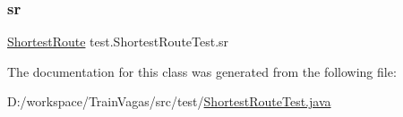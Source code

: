 \subsubsection{\texorpdfstring{sr}{sr}}
{\footnotesize\ttfamily \hyperlink{classdomain_1_1_shortest_route}{Shortest\+Route} test.\+Shortest\+Route\+Test.\+sr\hspace{0.3cm}{\ttfamily [package]}}



The documentation for this class was generated from the following file\+:\begin{DoxyCompactItemize}
\item 
D\+:/workspace/\+Train\+Vagas/src/test/\hyperlink{_shortest_route_test_8java}{Shortest\+Route\+Test.\+java}\end{DoxyCompactItemize}
